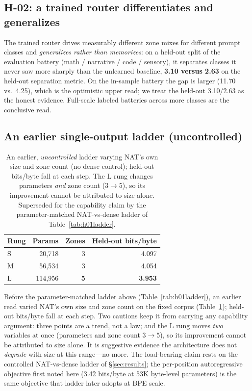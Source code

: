 \documentclass[11pt]{article}
\begin{document}
\subsection{H-02: a trained router differentiates and generalizes}
The trained router drives measurably different zone mixes for different prompt classes and
\emph{generalizes rather than memorizes}: on a held-out split of the evaluation battery (math /
narrative / code / sensory), it separates classes it never saw more sharply than the unlearned
baseline, \textbf{3.10 versus 2.63} on the held-out separation metric. On the in-sample battery the
gap is larger (11.70 vs.\ 4.25), which is the optimistic upper read; we treat the held-out 3.10/2.63
as the honest evidence. Full-scale labeled batteries across more classes are the conclusive read.

\subsection{An earlier single-output ladder (uncontrolled)}
\begin{table}[h]\centering\small
\begin{tabular}{@{}lrrr@{}}
\toprule
Rung & Params & Zones & Held-out bits/byte \\
\midrule
S & 20{,}718 & 3 & 4.097 \\
M & 56{,}534 & 3 & 4.054 \\
L & 114{,}956 & \textbf{5} & \textbf{3.953} \\
\bottomrule
\end{tabular}
\caption{An earlier, \emph{uncontrolled} ladder varying NAT's own size and zone count (no dense
control); held-out bits/byte fall at each step. The L rung changes parameters \emph{and} zone count
(3$\to$5), so its improvement cannot be attributed to size alone. Superseded for the capability claim
by the parameter-matched NAT-vs-dense ladder of Table~\ref{tab:h01ladder}.}
\label{tab:ladder}
\end{table}
Before the parameter-matched ladder above (Table~\ref{tab:h01ladder}), an earlier read varied NAT's
own size and zone count on the fixed corpus (Table~\ref{tab:ladder}); held-out bits/byte fall at each
step. Two cautions keep it from carrying any capability argument: three points are a trend, not a
law; and the L rung moves \emph{two} variables at once (parameters and zone count $3\to5$), so its
improvement cannot be attributed to size alone. It is suggestive evidence the architecture does not
\emph{degrade} with size at this range---no more. The load-bearing claim rests on the controlled
NAT-vs-dense ladder of \S\ref{sec:results}; the per-position autoregressive objective first noted
here (3.42 bits/byte at 53K byte-level parameters) is the same objective that ladder later adopts at
BPE scale.
\end{document}

